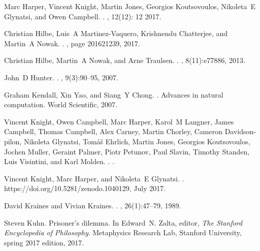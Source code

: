 \documentclass[10pt,letterpaper]{article}
\begin{document}
\begin{thebibliography}{10}
Marc Harper, Vincent Knight, Martin Jones, Georgios Koutsovoulos, Nikoleta~E
  Glynatsi, and Owen Campbell.
.
, 12(12): 12 2017.

Christian Hilbe, Luis~A Martinez-Vaquero, Krishnendu Chatterjee, and Martin~A
  Nowak.
.
, page
  201621239, 2017.

Christian Hilbe, Martin~A Nowak, and Arne Traulsen.
.
, 8(11):e77886, 2013.

John~D Hunter.
.
, 9(3):90--95, 2007.

Graham Kendall, Xin Yao, and Siang~Y Chong.
.
\newblock Advances in natural computation. World Scientific, 2007.

Vincent Knight, Owen Campbell, Marc Harper, Karol~M Langner, James Campbell,
  Thomas Campbell, Alex Carney, Martin Chorley, Cameron Davidson-pilon,
  Nikoleta Glynatsi, Tom{\'{a}}{\v{s}} Ehrlich, Martin Jones, Georgios
  Koutsovoulos, Jochen Muller, Geraint Palmer, Piotr Petunov, Paul Slavin,
  Timothy Standen, Luis Visintini, and Karl Molden.
.
.

Vincent Knight, Marc Harper, and Nikoleta~E Glynatsi.
.
\newblock https://doi.org/10.5281/zenodo.1040129, July 2017.

David Kraines and Vivian Kraines.
.
, 26(1):47--79, 1989.

Steven Kuhn.
\newblock Prisoner's dilemma.
\newblock In Edward~N. Zalta, editor, {\em The Stanford Encyclopedia of
  Philosophy}. Metaphysics Research Lab, Stanford University, spring 2017
  edition, 2017.


\end{thebibliography}
\end{document}
